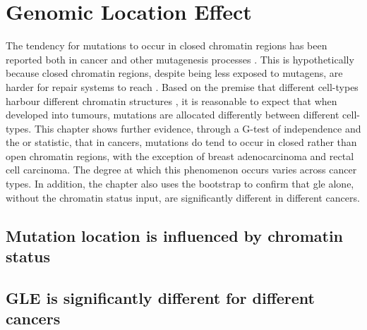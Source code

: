 \chapter{Genomic Location Effect}\label{gle}

The tendency for mutations to occur in closed \gls{chromatin} regions has been reported both in cancer and other mutagenesis processes \citep{Polak2015,Prendergast2007ChromatinGenome}. This is hypothetically because closed chromatin regions, despite being less exposed to mutagens, are harder for repair systems to reach \citep{Prendergast2007ChromatinGenome,Teng1997ExcisionSequences, Morse2002PhotoreactivationCerevisiae}. Based on the premise that different cell-types harbour different chromatin structures \citep{Kundaje2015IntegrativeEpigenomes}, it is reasonable to expect that when developed into tumours, mutations are allocated differently between different cell-types. This chapter shows further evidence, through a G-test of independence and the \gls{or} statistic, that in cancers, mutations do tend to occur in closed rather than open chromatin regions, with the exception of breast adenocarcinoma and rectal cell carcinoma. The degree at which this phenomenon occurs varies across cancer types. In addition, the chapter also uses the \gls{bootstrap} to confirm that \gls{gle} alone, without the chromatin status input, are significantly different in different cancers. 

\section{Mutation location is influenced by chromatin status}
\section{GLE is significantly different for different cancers}